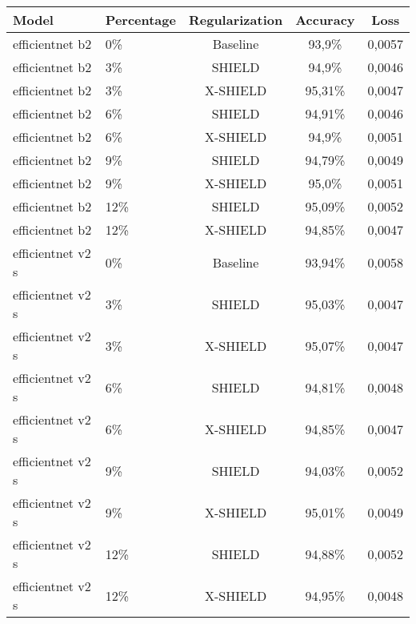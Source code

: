 \begin{tabular}{llccc}
\toprule
Model & Percentage & Regularization & Accuracy & Loss \\
\midrule
efficientnet b2 & 0\% & Baseline & 93,9\% & 0,0057 \\
efficientnet b2 & 3\% & SHIELD & 94,9\% & 0,0046 \\
efficientnet b2 & 3\% & X-SHIELD & 95,31\% & 0,0047 \\
efficientnet b2 & 6\% & SHIELD & 94,91\% & 0,0046 \\
efficientnet b2 & 6\% & X-SHIELD & 94,9\% & 0,0051 \\
efficientnet b2 & 9\% & SHIELD & 94,79\% & 0,0049 \\
efficientnet b2 & 9\% & X-SHIELD & 95,0\% & 0,0051 \\
efficientnet b2 & 12\% & SHIELD & 95,09\% & 0,0052 \\
efficientnet b2 & 12\% & X-SHIELD & 94,85\% & 0,0047 \\
efficientnet v2 s & 0\% & Baseline & 93,94\% & 0,0058 \\
efficientnet v2 s & 3\% & SHIELD & 95,03\% & 0,0047 \\
efficientnet v2 s & 3\% & X-SHIELD & 95,07\% & 0,0047 \\
efficientnet v2 s & 6\% & SHIELD & 94,81\% & 0,0048 \\
efficientnet v2 s & 6\% & X-SHIELD & 94,85\% & 0,0047 \\
efficientnet v2 s & 9\% & SHIELD & 94,03\% & 0,0052 \\
efficientnet v2 s & 9\% & X-SHIELD & 95,01\% & 0,0049 \\
efficientnet v2 s & 12\% & SHIELD & 94,88\% & 0,0052 \\
efficientnet v2 s & 12\% & X-SHIELD & 94,95\% & 0,0048 \\
\bottomrule
\end{tabular}
